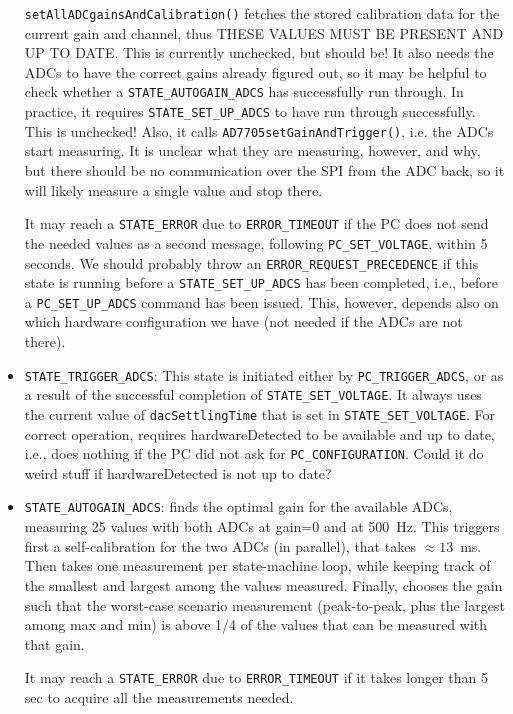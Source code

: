 \documentclass[11pt,a4paper,english]{article}
\begin{document}
\begin{itemize}
	\texttt{setAllADCgainsAndCalibration()} fetches the stored calibration data for the current gain and channel, thus THESE VALUES MUST BE PRESENT AND UP TO DATE. This is currently unchecked, but should be! It also needs the ADCs to have the correct gains already figured out, so it may be helpful to check whether a \texttt{STATE\_AUTOGAIN\_ADCS} has successfully run through. In practice, it requires \texttt{STATE\_SET\_UP\_ADCS} to have run through successfully. This is unchecked! Also, it calls \texttt{AD7705setGainAndTrigger()}, i.e. the ADCs start measuring. It is unclear what they are measuring, however, and why, but there should be no communication over the SPI from the ADC back, so it will likely measure a single value and stop there.

	It may reach a \texttt{STATE\_ERROR} due to \texttt{ERROR\_TIMEOUT} if the PC does not send the needed values as a second message, following \texttt{PC\_SET\_VOLTAGE}, within 5 seconds. We should probably throw an \texttt{ERROR\_REQUEST\_PRECEDENCE} if this state is running before a \texttt{STATE\_SET\_UP\_ADCS} has been completed, i.e., before a \texttt{PC\_SET\_UP\_ADCS} command has been issued. This, however, depends also on which hardware configuration we have (not needed if the ADCs are not there).

\item \texttt{STATE\_TRIGGER\_ADCS}: This state is initiated either by \texttt{PC\_TRIGGER\_ADCS}, or as a result of the successful completion of \texttt{STATE\_SET\_VOLTAGE}. It always uses the current value of \texttt{dacSettlingTime} that is set in \texttt{STATE\_SET\_VOLTAGE}. For correct operation, requires hardwareDetected to be available and up to date, i.e., does nothing if the PC did not ask for \texttt{PC\_CONFIGURATION}. Could it do weird stuff if hardwareDetected is not up to date?

\item \texttt{STATE\_AUTOGAIN\_ADCS}: finds the optimal gain for the available ADCs, measuring 25 values with both ADCs at gain=0 and at 500~Hz. This triggers first a self-calibration for the two ADCs (in parallel), that takes $\approx13$~ms. Then takes one measurement per state-machine loop, while keeping track of the smallest and largest among the values measured. Finally, chooses the gain such that the worst-case scenario measurement (peak-to-peak, plus the largest among max and min) is above 1/4 of the values that can be measured with that gain.

	It may reach a \texttt{STATE\_ERROR} due to \texttt{ERROR\_TIMEOUT} if it takes longer than 5 sec to acquire all the measurements needed.


\end{itemize}
\end{document}
